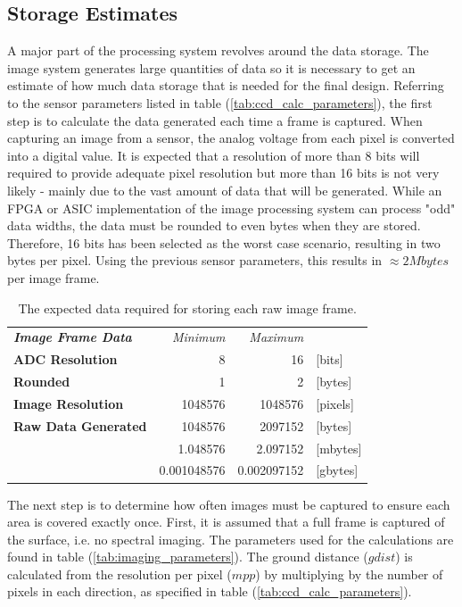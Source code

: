 \subsection{Storage Estimates}
A major part of the processing system revolves around the data storage. The image system generates large quantities of data so it is necessary to get an estimate of how much data storage that is needed for the final design. Referring to the sensor parameters listed in table (\ref{tab:ccd_calc_parameters}), the first step is to calculate the data generated each time a frame is captured. When capturing an image from a sensor, the analog voltage from each pixel is converted into a digital value. It is expected that a resolution of more than 8 bits will required to provide adequate pixel resolution but more than 16 bits is not very likely - mainly due to the vast amount of data that will be generated. While an FPGA or ASIC implementation of the image processing system can process "odd" data widths, the data must be rounded to even bytes when they are stored. Therefore, 16 bits has been selected as the worst case scenario, resulting in two bytes per pixel. Using the previous sensor parameters, this results in $\approx 2 Mbytes$ per image frame.
\begin{table}[htb]
  \centering
\begin{tabular}{l|r|r|l}
\textit{\textbf{Image Frame Data}} & \textit{Minimum} & \multicolumn{1}{r}{\textit{Maximum}} &  \bigstrut[b]\\
\cline{1-3}\textbf{ADC Resolution} & 8     & 16    & [bits] \bigstrut[t]\\
\textbf{Rounded} & 1     & 2     & [bytes] \bigstrut[b]\\
\cline{1-3}\textbf{Image Resolution} & 1048576 & 1048576 & [pixels] \bigstrut\\
\cline{1-3}\textbf{Raw Data Generated} & 1048576 & 2097152 & [bytes] \bigstrut[t]\\
      & 1.048576 & 2.097152 & [mbytes] \\
      & 0.001048576 & 0.002097152 & [gbytes] \\
\end{tabular}%
    \caption{The expected data required for storing each raw image frame.}
  \label{tab:img_frame_data}%
\end{table}%
The next step is to determine how often images must be captured to ensure each area is covered exactly once. First, it is assumed that a full frame is captured of the surface, i.e. no spectral imaging. The parameters used for the calculations are found in table (\ref{tab:imaging_parameters}). The ground distance ($gdist$) is calculated from the resolution per pixel ($mpp$) by multiplying by the number of pixels in each direction, as specified in table (\ref{tab:ccd_calc_parameters}).
